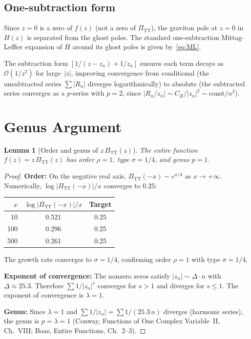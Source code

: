 \documentclass[11pt,a4paper]{article}
\newcommand{\PiTT}{\Pi_{\mathrm{TT}}}
\newcommand{\order}{\mathcal{O}}
\newtheorem{lemma}[theorem]{Lemma}
\begin{document}
\subsection{One-subtraction form}

Since $z = 0$ is a zero of $f(z)$ (not a zero of $\PiTT$), the graviton
pole at $z = 0$ in $H(z)$ is separated from the ghost poles.  The
standard one-subtraction Mittag-Leffler expansion of $H$ around its
ghost poles is given by~\eqref{eq:ML}.

The subtraction form $[1/(z - z_n) + 1/z_n]$ ensures each term decays as
$\order(1/z^2)$ for large~$|z|$, improving convergence from conditional
(the unsubtracted series $\sum |R_n|$ diverges logarithmically) to absolute
(the subtracted series converges as a $p$-series with $p = 2$, since
$|R_n/z_n| \sim C_R/|z_n|^2 \sim \text{const}/n^2$).

\section{Genus Argument}
\label{sec:genus}

\begin{lemma}[Order and genus of $z\,\PiTT(z)$]\label{lem:genus}
  The entire function $f(z) = z\,\PiTT(z)$ has order $\rho = 1$,
  type $\sigma = 1/4$, and genus $p = 1$.
\end{lemma}

\begin{proof}
  \textbf{Order:} On the negative real axis,
  $\PiTT(-x) \sim e^{x/4}$ as $x \to +\infty$.  Numerically,
  $\log|\PiTT(-x)|/x$ converges to $0.25$:
  \begin{center}
  \begin{tabular}{rcc}
    \toprule
    $x$ & $\log|\PiTT(-x)|/x$ & Target \\
    \midrule
    10 & 0.521 & 0.25 \\
    100 & 0.296 & 0.25 \\
    500 & 0.261 & 0.25 \\
    \bottomrule
  \end{tabular}
  \end{center}
  The growth rate converges to $\sigma = 1/4$, confirming order $\rho = 1$
  with type $\sigma = 1/4$.

  \textbf{Exponent of convergence:} The nonzero zeros satisfy
  $|z_n| \sim \Delta \cdot n$ with $\Delta \approx 25.3$.  Therefore
  $\sum 1/|z_n|^s$ converges for $s > 1$ and diverges for $s \leq 1$.
  The exponent of convergence is $\lambda = 1$.

  \textbf{Genus:} Since $\lambda = 1$ and $\sum 1/|z_n| = \sum 1/(25.3\,n)$
  diverges (harmonic series), the genus is $p = \lambda = 1$ (Conway,
  Functions of One Complex Variable~II, Ch.~VIII; Boas, Entire Functions,
  Ch.~2--3).
\end{proof}
\end{document}
